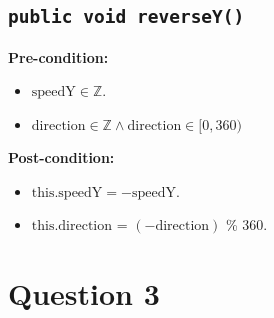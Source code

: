 \documentclass{article}
\begin{document}
\subsection*{\texttt{public void reverseY()}}
\textbf{Pre-condition:}
\begin{itemize}
    \item \( \text{speedY} \in \mathbb{Z} \).
    \item \( \text{direction} \in \mathbb{Z} \wedge \text{direction} \in [0,360) \)
\end{itemize}

\textbf{Post-condition:}
\begin{itemize}
    \item \( \text{this.speedY} = -\text{speedY} \).
    \item \( \text{this.direction} \) = \( (-\text{direction}) \) \% 360.
\end{itemize}

\section*{Question 3}
\end{document}
